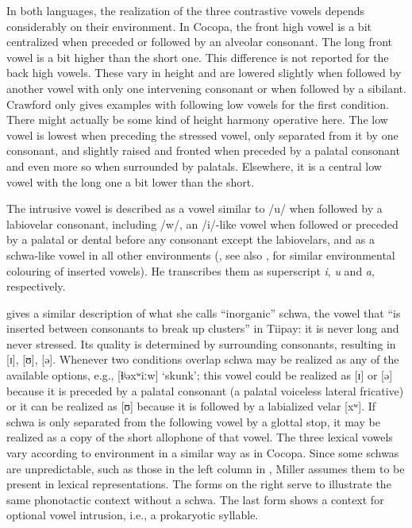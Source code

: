 \documentclass[output=paper,colorlinks,citecolor=brown]{langscibook}
\begin{document}
In both languages, the realization of the three contrastive vowels depends considerably on their environment. In Cocopa, the front high vowel is a bit centralized when preceded or followed by an alveolar consonant. The long front vowel is a bit higher than the short one. This difference is not reported for the back high vowels. These vary in height and are lowered slightly when followed by another vowel with only one intervening consonant or when followed by a sibilant. Crawford only gives examples with following low vowels for the first condition. There might actually be some kind of height harmony operative here. The low vowel is lowest when preceding the stressed vowel, only separated from it by one consonant, and slightly raised and fronted when preceded by a palatal consonant and even more so when surrounded by palatals. Elsewhere, it is a central low vowel with the long one a bit lower than the short.

The intrusive vowel is described as a vowel similar to /u/ when followed by a labiovelar consonant, including /w/, an /i/-like vowel when followed or preceded by a palatal or dental before any consonant except the labiovelars, and as a schwa-like vowel in all other environments (\cite[38]{Crawford1966}, see also , for similar environmental colouring of inserted vowels). He transcribes them as superscript \textit{i}, \textit{u} and \textit{a}, respectively.

\citet[20]{Miller2001} gives a similar description of what she calls “inorganic” schwa, the vowel that “is inserted between consonants to break up clusters” in Tiipay: it is never long and never stressed. Its quality is determined by surrounding consonants, resulting in [ɪ], [ʊ], [ə]. Whenever two conditions overlap schwa may be realized as any of the available options, e.g., [ɬʲəxʷiːw] ‘skunk’; this vowel could be realized as [ɪ] or [ə] because it is preceded by a palatal consonant (a palatal voiceless lateral fricative) or it can be realized as [ʊ] because it is followed by a labialized velar [xʷ]. If schwa is only separated from the following vowel by a glottal stop, it may be realized as a copy of the short allophone of that vowel. The three lexical vowels vary according to environment in a similar way as in Cocopa. Since some schwas are unpredictable, such as those in the left column in , Miller assumes them to be present in lexical representations. The forms on the right serve to illustrate the same phonotactic context without a schwa. The last form shows a context for optional vowel intrusion, i.e., a prokaryotic syllable.
\end{document}
